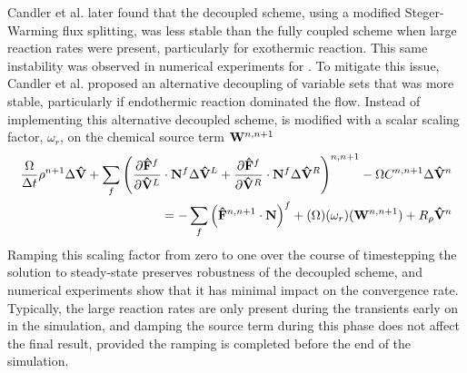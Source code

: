 Candler et al.\cite{candler2013analysis} later found that the decoupled scheme,
using a modified Steger-Warming flux splitting, was less stable than the fully
coupled scheme when large reaction rates were present, particularly for
exothermic reaction.  This same instability was observed in numerical
experiments for .  To mitigate this issue, Candler et
al. proposed an alternative decoupling of variable sets that was more stable,
particularly if endothermic reaction dominated the flow.  Instead of
implementing this alternative decoupled scheme,  is
modified with a scalar scaling factor, $\omega_r$, on the chemical source term
$\mathbf W^{n,n+1}$
\begin{equation} 
  \begin{split}
    \frac{\Omega}{\Delta t} \rho^{n+1} \Delta\mathbf{\hat{V}} + 
    \sum\limits_{f}^{}{ \left( 
      \frac{\partial \mathbf{\hat{F}}^f}{\partial \mathbf{\hat{V}}^L} \cdot \mathbf{N}^f \Delta \mathbf{\hat{V}}^L 
    + \frac{\partial \mathbf{\hat{F}}^f}{\partial \mathbf{\hat{V}}^R} \cdot \mathbf{N}^f \Delta \mathbf{\hat{V}}^R 
    \right)^{n,n+1}} 
    - \Omega C^{n,n+1} \Delta \mathbf{\hat{V}}^n \\ 
    = -\sum\limits_{f}^{}{
      \left( \mathbf{\hat{F}}^{n,n+1} \cdot \mathbf{N} \right)^f 
    } 
    + (\Omega)(\omega_r)(\mathbf W^{n, n+1}) + R_\rho \mathbf{\hat{V}}^n
  \end{split}
  \label{decoupled-with-scaling}
\end{equation}
Ramping this scaling factor from zero to one over the course of timestepping the
solution to steady-state preserves robustness of the decoupled scheme, and
numerical experiments show that it has minimal impact on the convergence rate.
Typically, the large reaction rates are only present during the transients early
on in the simulation, and damping the source term during this phase does not
affect the final result, provided the ramping is completed before the end of the
simulation.

